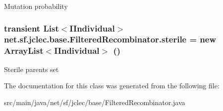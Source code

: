 Mutation probability \hypertarget{classnet_1_1sf_1_1jclec_1_1base_1_1_filtered_recombinator_a868d2538743c6926f579f1b7521011fa}{
\subsubsection[{sterile}]{\setlength{\rightskip}{0pt plus 5cm}transient List$<${\bf I\-Individual}$>$ net.\-sf.\-jclec.\-base.\-Filtered\-Recombinator.\-sterile = new Array\-List$<${\bf I\-Individual}$>$ ()\hspace{0.3cm}{\ttfamily [protected]}}}\label{classnet_1_1sf_1_1jclec_1_1base_1_1_filtered_recombinator_a868d2538743c6926f579f1b7521011fa}
Sterile parents set 

The documentation for this class was generated from the following file\-:\begin{DoxyCompactItemize}
\item 
src/main/java/net/sf/jclec/base/Filtered\-Recombinator.\-java\end{DoxyCompactItemize}
